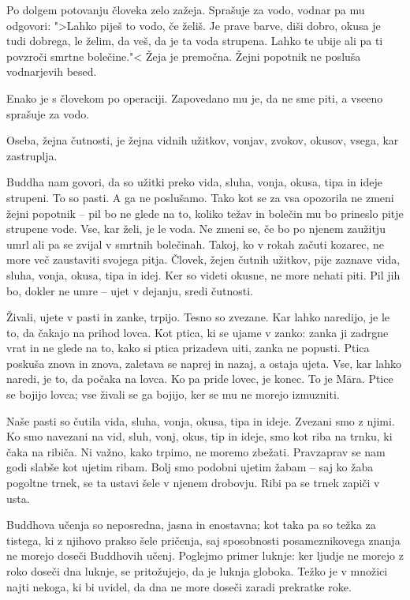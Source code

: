 
Po dolgem potovanju človeka zelo zažeja. Sprašuje za vodo, vodnar pa mu odgovori: ">Lahko piješ to vodo, če želiš. Je prave barve, diši dobro, okusa je tudi dobrega, le želim, da veš, da je ta voda strupena. Lahko te ubije ali pa ti povzroči smrtne bolečine."< Žeja je premočna. Žejni popotnik ne posluša vodnarjevih besed.

Enako je s človekom po operaciji. Zapovedano mu je, da ne sme piti, a vseeno sprašuje za vodo.

Oseba, žejna čutnosti, je žejna vidnih užitkov, vonjav, zvokov, okusov, vsega, kar zastruplja.

Buddha nam govori, da so užitki preko vida, sluha, vonja, okusa, tipa in ideje strupeni. To so pasti. A ga ne poslušamo. Tako kot se za vsa opozorila ne zmeni žejni popotnik – pil bo ne glede na to, koliko težav in bolečin mu bo prineslo pitje strupene vode. Vse, kar želi, je le voda. Ne zmeni se, če bo po njenem zaužitju umrl ali pa se zvijal v smrtnih bolečinah. Takoj, ko v rokah začuti kozarec, ne more več zaustaviti svojega pitja. Človek, žejen čutnih užitkov, pije zaznave vida, sluha, vonja, okusa, tipa in idej. Ker so videti okusne, ne more nehati piti. Pil jih bo, dokler ne umre – ujet v dejanju, sredi čutnosti.

\clearpage


Živali, ujete v pasti in zanke, trpijo. Tesno so zvezane. Kar lahko naredijo, je le to, da čakajo na prihod lovca. Kot ptica, ki se ujame v zanko: zanka ji zadrgne vrat in ne glede na to, kako si ptica prizadeva uiti, zanka ne popusti. Ptica poskuša znova in znova, zaletava se naprej in nazaj, a ostaja ujeta. Vse, kar lahko naredi, je to, da počaka na lovca. Ko pa pride lovec, je konec. To je Māra. Ptice se bojijo lovca; vse živali se ga bojijo, ker se mu ne morejo izmuzniti.

Naše pasti so čutila vida, sluha, vonja, okusa, tipa in ideje. Zvezani smo z njimi. Ko smo navezani na vid, sluh, vonj, okus, tip in ideje, smo kot riba na trnku, ki čaka na ribiča. Ni važno, kako trpimo, ne moremo zbežati. Pravzaprav se nam godi slabše kot ujetim ribam. Bolj smo podobni ujetim žabam – saj ko žaba pogoltne trnek, se ta ustavi šele v njenem drobovju. Ribi pa se trnek zapiči v usta.

\clearpage


Buddhova učenja so neposredna, jasna in enostavna; kot taka pa so težka za tistega, ki z njihovo prakso šele pričenja, saj sposobnosti posameznikovega znanja ne morejo doseči Buddhovih učenj. Poglejmo primer luknje: ker ljudje ne morejo z roko doseči dna luknje, se pritožujejo, da je luknja globoka. Težko je v množici najti nekoga, ki bi uvidel, da dna ne more doseči zaradi prekratke roke.

